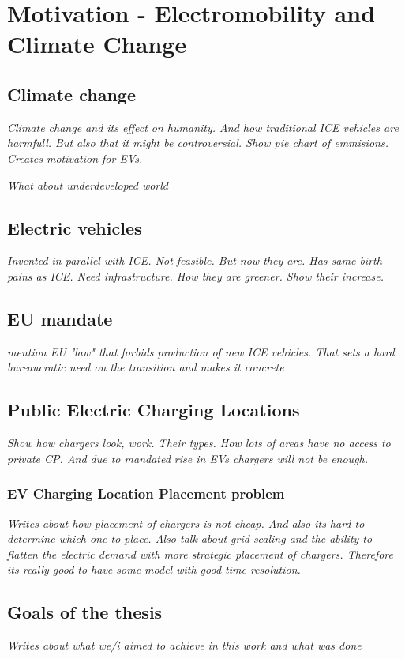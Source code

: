 
\setchapterpreamble[u]{\margintoc}
\chapter{Motivation - Electromobility and Climate Change}



\section{Climate change}

\textit{Climate change and its effect on humanity. And how traditional ICE vehicles are harmfull. But also that it might be controversial. Show pie chart of emmisions. Creates motivation for EVs.}

\textit{What about underdeveloped world}

\section{Electric vehicles}

\textit{Invented in parallel with ICE. Not feasible. But now they are. Has same birth pains as ICE. Need infrastructure. How they are greener. Show their increase.}

\section{EU mandate}


\textit{mention EU "law" that forbids production of new ICE vehicles. That sets a hard bureaucratic need on the transition and makes it concrete}

\section{Public Electric Charging Locations}

\textit{Show how chargers look, work. Their types. How lots of areas have no access to private CP. And due to mandated rise in EVs chargers will not be enough.}

\subsection{EV Charging Location Placement problem}

\textit{Writes about how placement of chargers is not cheap. And also its hard to determine which one to place. Also talk about grid scaling and the ability to flatten the electric demand with more strategic placement of chargers. Therefore its really good to have some model with good time resolution.}

\section{Goals of the thesis}

\textit{Writes about what we/i aimed to achieve in this work and what was done}